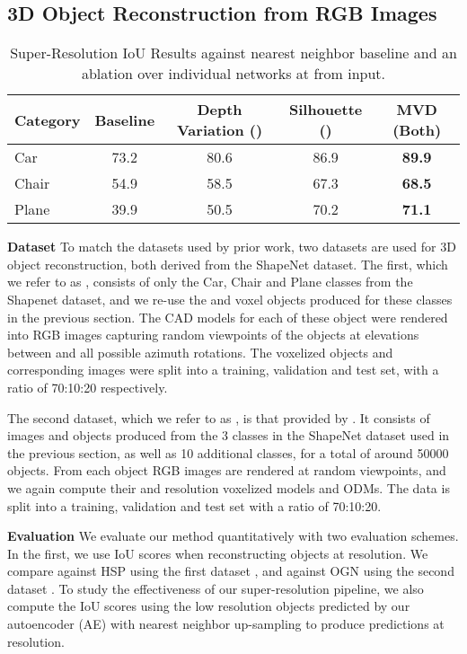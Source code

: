 \documentclass{article}
\begin{document}
\subsection{3D Object Reconstruction from RGB Images}

\begin{table}
  \caption{Super-Resolution IoU Results against nearest neighbor baseline and an ablation over individual networks at  from  input.} \label{table:SR} 
  \centering
  \begin{tabular}{lcccc}
    \toprule
    Category 	& Baseline & Depth Variation () & Silhouette () & MVD (Both) \\
    \midrule
    Car 		& 73.2 & 80.6 & 86.9 & \bf{89.9} \\
   	Chair 		& 54.9 & 58.5 & 67.3 & \bf{68.5} \\
    Plane 		& 39.9 & 50.5 & 70.2 & \bf{71.1} \\
    \bottomrule
  \end{tabular}
\end{table} 


\textbf{Dataset} \quad To match the datasets used by prior work, two datasets are used for 3D object reconstruction, both derived from the ShapeNet dataset. The first, which we refer to as , consists of only the Car, Chair and Plane classes from the Shapenet dataset, and we re-use the  and  voxel objects produced for these classes in the previous section. The CAD models for each of these object were rendered into  RGB images capturing random viewpoints of the objects at elevations between  and all possible azimuth rotations. The voxelized objects and corresponding images were split into a training, validation and test set, with a ratio of 70:10:20 respectively.

The second dataset, which we refer to as , is that provided by \citet{choy20163d}. It consists of images and objects produced from  the 3 classes in the ShapeNet dataset used in the previous section, as well as 10 additional classes, for a total of around 50000 objects. From each object  RGB images are rendered at random viewpoints, and we again compute their  and  resolution voxelized models and ODMs. The data is split into a training, validation and test set with a ratio of 70:10:20. 

\textbf{Evaluation} \quad 
We evaluate our method quantitatively with two evaluation schemes. In the first, we use IoU scores when reconstructing objects at  resolution. We compare against HSP \cite{HSP} using the first dataset , and against OGN \cite{OGN} using the second dataset . To study the effectiveness of our super-resolution pipeline, we also compute the IoU scores using the low resolution objects predicted by our autoencoder (AE) with nearest neighbor up-sampling to produce predictions at  resolution. 
\end{document}
